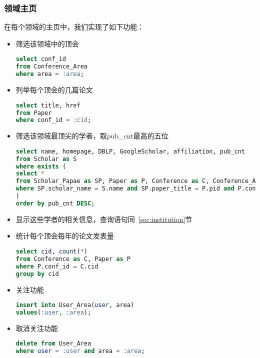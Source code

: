 \subsubsection{领域主页}
在每个领域的主页中，我们实现了如下功能：
\begin{itemize}
\item 筛选该领域中的顶会
\begin{lstlisting}[language=SQL]
select conf_id
from Conference_Area
where area = :area;
\end{lstlisting}
\item 列举每个顶会的几篇论文
\begin{lstlisting}[language=SQL]
select title, href
from Paper
where conf_id = :cid;
\end{lstlisting}
\item 筛选该领域最顶尖的学者，取pub\_cnt最高的五位
\begin{lstlisting}[language=SQL]
select name, homepage, DBLP, GoogleScholar, affiliation, pub_cnt
from Scholar as S
where exists (
select *
from Scholar_Papae as SP, Paper as P, Conference as C, Conference_Area as CA
where SP.scholar_name = S.name and SP.paper_title = P.pid and P.conf_id = C.cid and CA.conf_id = C.cid and CA.area = :area
)
order by pub_cnt DESC;
\end{lstlisting}
\item 显示这些学者的相关信息，查询语句同~\ref{sec:institution}节
\item 统计每个顶会每年的论文发表量
\begin{lstlisting}[language=SQL]
select cid, count(*)
from Conference as C, Paper as P
where P.conf_id = C.cid
group by cid
\end{lstlisting}
\item 关注功能
\begin{lstlisting}[language=SQL]
insert into User_Area(user, area)
values(:user, :area);
\end{lstlisting}
\item 取消关注功能
\begin{lstlisting}[language=SQL]
delete from User_Area
where user = :user and area = :area;
\end{lstlisting}
\end{itemize}

